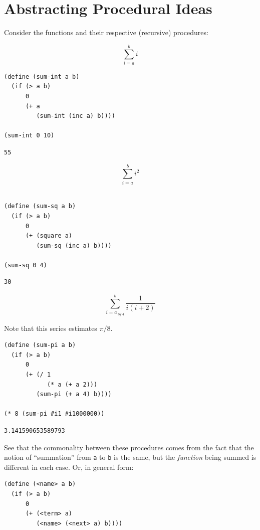 \documentclass[9pt]{report}
\begin{document}
\section{Abstracting Procedural Ideas}
\label{sec:org120221c}

Consider the functions and their respective (recursive) procedures:

$$\sum_{i=a}^{b} i$$

\begin{verbatim}
(define (sum-int a b)
  (if (> a b)
      0
      (+ a
         (sum-int (inc a) b))))

(sum-int 0 10)
\end{verbatim}

\begin{verbatim}
55
\end{verbatim}


$$\sum_{i=a}^{b} i^{2}$$

\begin{verbatim}

(define (sum-sq a b)
  (if (> a b)
      0
      (+ (square a)
         (sum-sq (inc a) b))))

(sum-sq 0 4)
\end{verbatim}

\begin{verbatim}
30
\end{verbatim}


$$\sum_{i=a_{\mathrm{~by~}4}}^{b} \frac{1}{i(i+2)}$$

Note that this series estimates \(\pi /8\).

\begin{verbatim}
(define (sum-pi a b)
  (if (> a b)
      0
      (+ (/ 1
            (* a (+ a 2)))
         (sum-pi (+ a 4) b))))

(* 8 (sum-pi #i1 #i1000000))
\end{verbatim}

\begin{verbatim}
3.141590653589793
\end{verbatim}



See that the commonality between these procedures comes from the
fact that the notion of ``summation'' from \texttt{a} to \texttt{b} is the same,
but the \emph{function} being summed is different in each case. Or, in
general form:

\begin{verbatim}
(define (<name> a b)
  (if (> a b)
      0
      (+ (<term> a)
         (<name> (<next> a) b))))
\end{verbatim}
\end{document}

